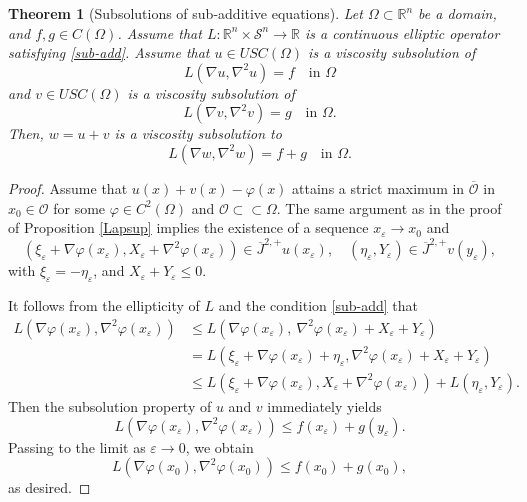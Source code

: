 \documentclass[12pt, reqno]{amsart}
\newtheorem{theorem}{Theorem}
\newcommand{\R}{\mathbb{R}}
\newcommand{\Jop}{\overline{J}^{2,+}}
\def\vep{\varepsilon}
\def\R{{\mathbb R}}
\def\S{{\mathcal S}}
\def\O{{\mathcal O}}
\begin{document}
\begin{theorem}[Subsolutions of sub-additive equations]\label{super-common}
   Let $\Omega\subset \mathbb{R}^n$ be a domain, and $f, g\in C(\Omega)$. Assume that $L:\R^n\times \S^n\to \R$ is a continuous elliptic operator satisfying \eqref{sub-add}. 
Assume that $u\in USC(\Omega)$ is a viscosity subsolution of \begin{equation}\label{conL}
     L(\nabla u,\nabla^2 u)=f\quad \text{in $\Omega$}
     \end{equation}
     and $v\in USC(\Omega)$ is a viscosity subsolution of 
     \begin{equation}\label{conL2}
     L(\nabla v,\nabla^2 v)=g\quad \text{in $\Omega$}.
     \end{equation}
    Then, $w=u+v$ is a viscosity subsolution to \begin{equation}\label{conL3}
     L(\nabla w,\nabla^2 w)=f+g\quad \text{in $\Omega$}.
     \end{equation} 
\end{theorem}

\begin{proof}
     Assume that $u(x)+v(x)-\varphi(x)$ attains a strict maximum in $\overline{\O}$ in $x_0\in \O$ for some $\varphi\in C^2(\Omega)$ and ${\O}\subset\subset \Omega$. The same argument as in the proof of Proposition \ref{Lapsup} implies the existence of a sequence $x_\vep\to x_0$ and %
\[
(\xi_\varepsilon+\nabla \varphi(x_\varepsilon), X_\varepsilon+\nabla^2 \varphi(x_\varepsilon))\in \Jop u(x_\varepsilon), \quad(\eta_\varepsilon, Y_\varepsilon)\in \Jop v(y_\varepsilon),
\]
with $\xi_\varepsilon=-\eta_\varepsilon$, and $X_\varepsilon+Y_\varepsilon\le 0$. 

It follows from the ellipticity of $L$ and the condition \eqref{sub-add} that
\begin{equation}\label{test-L}
\begin{aligned}
L(\nabla \varphi(x_\varepsilon), \nabla^2\varphi(x_\varepsilon))&\le L\left(\nabla \varphi(x_\varepsilon),\ \nabla^2\varphi(x_\varepsilon)+ X_\varepsilon+Y_\varepsilon\right)\\
&=L\left(\xi_\varepsilon+\nabla \varphi(x_\varepsilon)+\eta_\vep, \nabla^2\varphi(x_\varepsilon)+ X_\varepsilon+Y_\varepsilon\right)\\
&\le L\left(\xi_\varepsilon+\nabla \varphi(x_\varepsilon), X_\varepsilon+\nabla^2 \varphi(x_\varepsilon)\right)+L(\eta_\varepsilon, Y_\varepsilon).
\end{aligned}
\end{equation}
Then the subsolution property of $u$ and $v$ immediately yields 
\[
L(\nabla \varphi(x_\varepsilon), \nabla^2\varphi(x_\varepsilon))\leq f(x_\vep)+g(y_\vep).
\]
Passing to the limit as $\vep\to 0$, we obtain 
\[
L(\nabla \varphi(x_0), \nabla^2\varphi(x_0))\leq f(x_0)+g(x_0),
\]
as desired. 
\end{proof}
\end{document}
